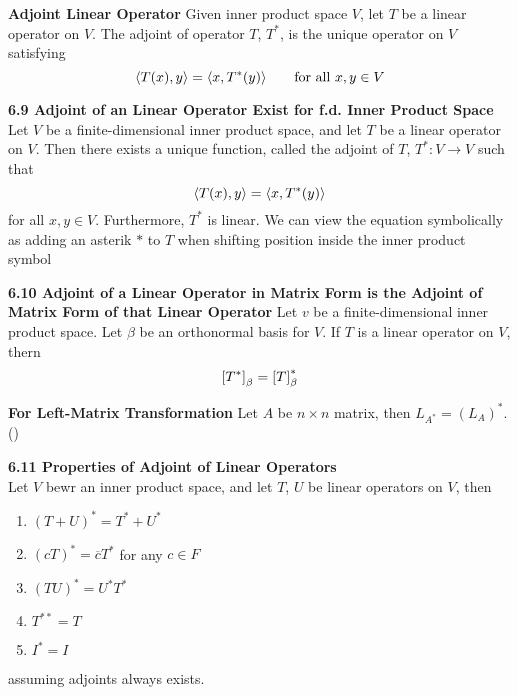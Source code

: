 \documentclass[11pt]{article}
\begin{document}
\begin{defn*}
    \textbf{Adjoint Linear Operator} Given inner product space $V$, let $T$ be a linear operator on $V$. The adjoint of operator $T$, $T^*$, is the unique operator on $V$ satisfying 
    \[
        \langle T(x),y\rangle = \langle x,T^*(y)\rangle    
        \qquad \text{for all $x,y\in V$}
    \]
\end{defn*}

\begin{theorem*}
    \textbf{6.9 Adjoint of an Linear Operator Exist for f.d. Inner Product Space} Let $V$ be a finite-dimensional inner product space, and let $T$ be a linear operator on $V$. Then there exists a unique function, called the adjoint of $T$, $T^*: V\to V$ such that
    \[
        \langle T(x),y\rangle = \langle x,T^*(y)\rangle    
    \]
    for all $x,y\in V$. Furthermore, $T^*$ is linear. We can view the equation symbolically as adding an asterik $*$ to $T$  when shifting position inside the inner product symbol
\end{theorem*}



\begin{theorem*}
    \textbf{6.10 Adjoint of a Linear Operator in Matrix Form is the Adjoint of Matrix Form of that Linear Operator} Let $v$ be a finite-dimensional inner product space. Let $\beta$ be an orthonormal basis for $V$. If $T$ is a linear operator on $V$, thern 
    \[
        \left[ T^* \right]_{\beta} = \left[ T \right]_{\beta}^*
    \]
\end{theorem*}

\begin{corollary*}
    \textbf{For Left-Matrix Transformation} Let $A$ be $n\times n$ matrix, then $L_{A^*} = (L_A)^*$. ()
\end{corollary*}

\begin{theorem*}
    \textbf{6.11 Properties of Adjoint of Linear Operators} \\
    Let $V$ bewr an inner product space, and let $T$, $U$ be linear operators on $V$, then 
    \begin{enumerate}
        \item $(T+U)^* = T^* + U^*$ 
        \item $(cT)^* = \overline{c}T^*$ for any $c\in F$
        \item $(TU)^* = U^*T^*$ 
        \item $T^{**} = T$ 
        \item $I^* = I$ 
    \end{enumerate}
    assuming adjoints always exists.
\end{theorem*}
\end{document}

